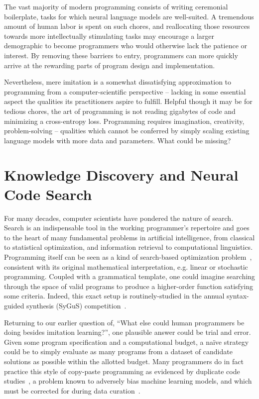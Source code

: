 \documentclass[10pt]{article}
\begin{document}
The vast majority of modern programming consists of writing ceremonial boilerplate, tasks for which neural language models are well-suited. A tremendous amount of human labor is spent on such chores, and reallocating those resources towards more intellectually stimulating tasks may encourage a larger demographic to become programmers who would otherwise lack the patience or interest. By removing these barriers to entry, programmers can more quickly arrive at the rewarding parts of program design and implementation.

Nevertheless, mere imitation is a somewhat dissatisfying approximation to programming from a computer-scientific perspective -- lacking in some essential aspect the qualities its practitioners aspire to fulfill. Helpful though it may be for tedious chores, the art of programming is not reading gigabytes of code and minimizing a cross-entropy loss. Programming requires imagination, creativity, problem-solving -- qualities which cannot be conferred by simply scaling existing language models with more data and parameters. What could be missing?

\section{Knowledge Discovery and Neural Code Search}

For many decades, computer scientists have pondered the nature of search. Search is an indispensable tool in the working programmer's repertoire and goes to the heart of many fundamental problems in artificial intelligence, from classical to statistical optimization, and information retrieval to computational linguistics. Programming itself can be seen as a kind of search-based optimization problem~\cite{alur2018search}, consistent with its original mathematical interpretation, e.g. linear or stochastic programming. Coupled with a grammatical template, one could imagine searching through the space of valid programs to produce a higher-order function satisfying some criteria. Indeed, this exact setup is routinely-studied in the annual syntax-guided synthesis (SyGuS) competition~\cite{alur2016sygus}.

Returning to our earlier question of, ``What else could human programmers be doing besides imitation learning?'', one plausible answer could be trial and error. Given some program specification and a computational budget, a naïve strategy could be to simply evaluate as many programs from a dataset of candidate solutions as possible within the allotted budget. Many programmers do in fact practice this style of copy-paste programming as evidenced by duplicate code studies~\cite{lopes2017dejavu}, a problem known to adversely bias machine learning models, and which must be corrected for during data curation~\cite{allamanis2019adverse}.
\end{document}
